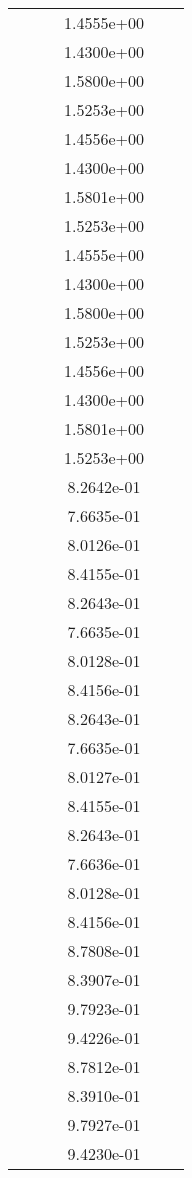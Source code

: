 \begin{xltabular}{\textwidth}{r|rS[table-format=1.3e+2]S[table-format=1.4e+2]S[table-format=1.4e+2]S[table-format=-1.5]}
&  &  & 1.4555e+00 & & \\
&  &  & 1.4300e+00 & & \\
&  &  & 1.5800e+00 & & \\
&  &  & 1.5253e+00 & & \\
&  &  & 1.4556e+00 & & \\
&  &  & 1.4300e+00 & & \\
&  &  & 1.5801e+00 & & \\
&  &  & 1.5253e+00 & & \\
&  &  & 1.4555e+00 & & \\
&  &  & 1.4300e+00 & & \\
&  &  & 1.5800e+00 & & \\
&  &  & 1.5253e+00 & & \\
&  &  & 1.4556e+00 & & \\
&  &  & 1.4300e+00 & & \\
&  &  & 1.5801e+00 & & \\
&  &  & 1.5253e+00 & & \\
&  &  & 8.2642e-01 & & \\
&  &  & 7.6635e-01 & & \\
&  &  & 8.0126e-01 & & \\
&  &  & 8.4155e-01 & & \\
&  &  & 8.2643e-01 & & \\
&  &  & 7.6635e-01 & & \\
&  &  & 8.0128e-01 & & \\
&  &  & 8.4156e-01 & & \\
&  &  & 8.2643e-01 & & \\
&  &  & 7.6635e-01 & & \\
&  &  & 8.0127e-01 & & \\
&  &  & 8.4155e-01 & & \\
&  &  & 8.2643e-01 & & \\
&  &  & 7.6636e-01 & & \\
&  &  & 8.0128e-01 & & \\
&  &  & 8.4156e-01 & & \\
&  &  & 8.7808e-01 & & \\
&  &  & 8.3907e-01 & & \\
&  &  & 9.7923e-01 & & \\
&  &  & 9.4226e-01 & & \\
&  &  & 8.7812e-01 & & \\
&  &  & 8.3910e-01 & & \\
&  &  & 9.7927e-01 & & \\
&  &  & 9.4230e-01 & & \\

\end{xltabular}
